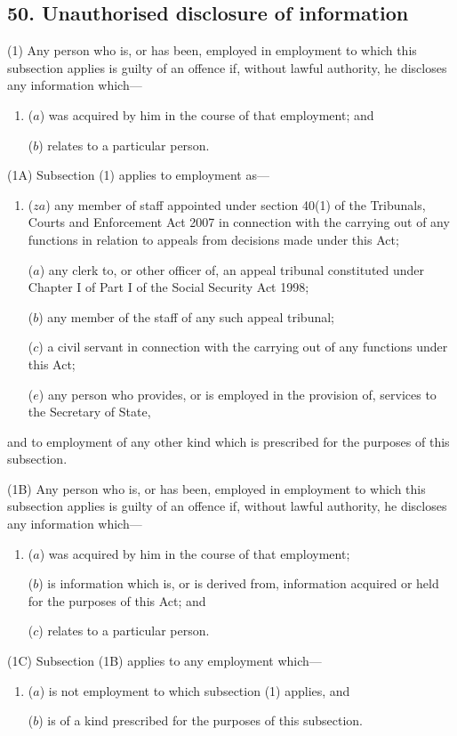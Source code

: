 \documentclass[12pt,a4paper]{article}
\begin{document}
\subsection{50. Unauthorised disclosure of information}

(1) Any person who is, or has been, employed in employment to which this subsection applies is guilty of an offence if, without lawful authority, he discloses any information which---
\begin{enumerate}\item[]
($a$)
was acquired by him in the course of that employment; and

($b$)
relates to a particular person.
\end{enumerate}

(1A) Subsection (1) applies to employment as---
\begin{enumerate}\item[]
 ($za$) any member of staff appointed under section 40(1) of the Tribunals, Courts and Enforcement Act 2007 in connection with the carrying out of any functions in relation to appeals from decisions made under this Act;

($a$) any clerk to, or other officer of, an appeal tribunal constituted under Chapter I of Part I of the Social Security Act 1998; 

($b$) any member of the staff of any such appeal tribunal;

($c$)
a civil servant in connection with the carrying out of any functions under this Act;

($e$)
any person who provides, or is employed in the provision of, services to the Secretary of State,
\end{enumerate}
and to employment of any other kind which is prescribed for the purposes of this subsection.

(1B) Any person who is, or has been, employed in employment to which this subsection applies is guilty of an offence if, without lawful authority, he discloses any information which---
\begin{enumerate}\item[]
($a$)
was acquired by him in the course of that employment;

($b$)
is information which is, or is derived from, information acquired or held for the purposes of this Act; and

($c$)
relates to a particular person.
\end{enumerate}

(1C)
Subsection (1B) applies to any employment which---
\begin{enumerate}\item[]
($a$)
is not employment to which subsection (1) applies, and

($b$)
is of a kind prescribed for the purposes of this subsection.
\end{enumerate}
\end{document}
